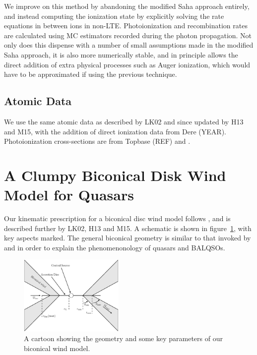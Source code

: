 \documentclass[useAMS,usenatbib]{mn2e_x}
\begin{document}
We improve on this method by abandoning the modified Saha approach
entirely, and instead computing the ionization state by 
explicitly solving the rate equations in between ions in non-LTE. 
Photoionization and recombination rates are calculated using MC estimators recorded
during the photon propagation. Not only does this dispense with a number of
small assumptions made in the modified Saha approach, it is also more numerically stable, 
and in principle allows the direct addition of extra physical processes such as Auger ionization, which would have to be approximated if using the previous technique.

\subsection{Atomic Data}

We use the same atomic data as described by LK02 and since
updated by H13 and M15, with the addition of direct ionization data from Dere (YEAR). 
Photoionization cross-sections are from Topbase (REF) and  \cite{vfky}.





\bigskip
\bigskip
\bigskip

\section{A Clumpy Biconical Disk Wind Model for Quasars}

Our kinematic prescription for a biconical disc wind model
follows \cite{SV93}, and is described further by
LK02, H13 and M15. A schematic is shown in figure~\ref{fig:cartoon},
with key aspects marked. The general biconical
geometry is similar to that invoked by \cite{MCGV95} and 
\cite{elvis2000} in order to explain the phenomenonology
of quasars and BALQSOs.


\begin{figure}
\centering
\includegraphics[width=0.45\textwidth]{figures/fig2_cartoon.eps}
\caption
{
A cartoon showing the geometry and some key parameters of
our biconical wind model.
}
\label{fig:cartoon}
\end{figure}
\end{document}
